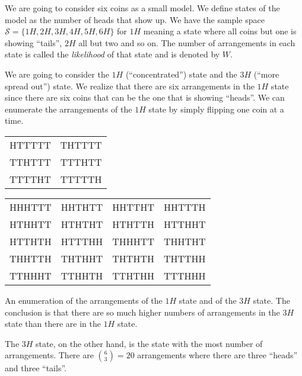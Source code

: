 \documentclass[../mit-general-chemistry.tex]{subfiles}
\begin{document}
We are going to consider six coins as a small model. We define states
of the model as the number of heads that
show up. We have the sample space $\mathscr{S} = \{1H, 2H, 3H, 4H, 5H,
6H\}$ for $1H$ meaning a state where all coins but one is showing
``tails'', $2H$ all but two and so on. The number of arrangements in
each state is called the {\em likelihood} of that state and is denoted
by $W$.

We are going to consider the $1H$ (``concentrated'') state and the
$3H$ (``more spread out'') state. We realize that there are six
arrangements in the $1H$ state since there are six coins that can be
the one that is showing ``heads''. We can enumerate the arrangements
of the $1H$ state by simply flipping one coin at a time.

\begin{htable}\label{tbl:coins:states}

  \hspace*{\fill}
  \begin{tabular}{ll}
    HTTTTT & THTTTT \\
    TTHTTT & TTTHTT \\
    TTTTHT & TTTTTH \\
  \end{tabular}
  \hspace*{\fill}

  \vspace{2em}
  
  \hspace*{\fill}
  \begin{tabular}{llll}
    HHHTTT & HHTHTT & HHTTHT & HHTTTH \\
    HTHHTT & HTHTHT & HTHTTH & HTTHHT \\
    HTTHTH & HTTTHH & THHHTT & THHTHT \\
    THHTTH & THTHHT & THTHTH & THTTHH \\
    TTHHHT & TTHHTH & TTHTHH & TTTHHH \\
  \end{tabular}
  \hspace*{\fill}
  
  \caption{ An enumeration of the arrangements of the $1H$ state and
    of the $3H$ state. The conclusion is that there are so much higher
    numbers of arrangements in the $3H$ state than there are in the
    $1H$ state.}
\end{htable}


The $3H$ state, on the other hand, is the state with the most number
of arrangements. There are $\binom{6}{3} = 20$ arrangements where
there are three ``heads'' and three ``tails''.
\end{document}
